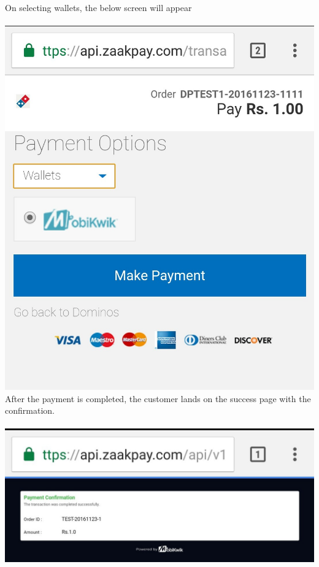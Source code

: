 \documentclass{article}
\begin{document}
\newpage
On selecting wallets, the below screen will appear
\\ \\ 
\includegraphics[width=4.4 in,height=5.4 in]{Screenshot_2016-11-23-19-21-26-672.jpg}
\newpage
After the payment is completed, the customer lands on the success page with the confirmation.
\\ \\ \includegraphics[width=5.4 in,height=3.1 in]{Screenshot_2016-11-23-16-10-28-991.jpg}
\end{document}
